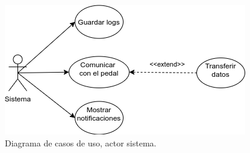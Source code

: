 \begin{figure}[!ht]
    \centering
    \includegraphics[scale=0.5]{images/diagram-usecase-system.png}
    \caption{Diagrama de casos de uso, actor sistema.}
    \label{fig: use-cases-system}
\end{figure}

